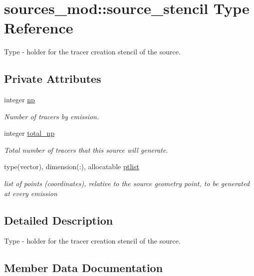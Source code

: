 \hypertarget{structsources__mod_1_1source__stencil}{}\section{sources\+\_\+mod\+:\+:source\+\_\+stencil Type Reference}
\label{structsources__mod_1_1source__stencil}


Type -\/ holder for the tracer creation stencil of the source.  


\subsection*{Private Attributes}
\begin{DoxyCompactItemize}
\item 
integer \hyperlink{structsources__mod_1_1source__stencil_a11ed46a8e923b5902cc02420d88158c5}{np}
\begin{DoxyCompactList}\small\item\em Number of tracers by emission. \end{DoxyCompactList}\item 
integer \hyperlink{structsources__mod_1_1source__stencil_ad7373d51bdf50a4595b6c0fa69f7f915}{total\+\_\+np}
\begin{DoxyCompactList}\small\item\em Total number of tracers that this source will generate. \end{DoxyCompactList}\item 
type(vector), dimension(\+:), allocatable \hyperlink{structsources__mod_1_1source__stencil_a154e50e2872650da574d0a1148e3065a}{ptlist}
\begin{DoxyCompactList}\small\item\em list of points (coordinates), relative to the source geometry point, to be generated at every emission \end{DoxyCompactList}\end{DoxyCompactItemize}


\subsection{Detailed Description}
Type -\/ holder for the tracer creation stencil of the source. 

\subsection{Member Data Documentation}
\mbox{\label{structsources__mod_1_1source__stencil_a11ed46a8e923b5902cc02420d88158c5}} 
